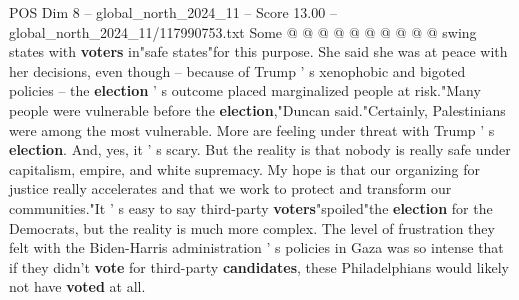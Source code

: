 \begin{textsample}{POS Dim 8 – global\_north\_2024\_11 – Score 13.00 – global\_north\_2024\_11/117990753.txt}
Some @ @ @ @ @ @ @ @ @ @ swing states with \textbf{voters} in"safe states"for this purpose.
She said she was at peace with her decisions, even though -- because of Trump ' s xenophobic and bigoted policies -- the \textbf{election} ' s outcome placed marginalized people at risk."Many people were vulnerable before the \textbf{election},"Duncan said."Certainly, Palestinians were among the most vulnerable.
More are feeling under threat with Trump ' s \textbf{election}.
And, yes, it ' s scary.
But the reality is that nobody is really safe under capitalism, empire, and white supremacy.
My hope is that our organizing for justice really accelerates and that we work to protect and transform our communities."It ' s easy to say third-party \textbf{voters}"spoiled"the \textbf{election} for the Democrats, but the reality is much more complex.
The level of frustration they felt with the Biden-Harris administration ' s policies in Gaza was so intense that if they didn't \textbf{vote} for third-party \textbf{candidates}, these Philadelphians would likely not have \textbf{voted} at all.

\end{textsample}
